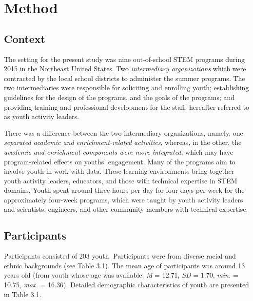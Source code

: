 \documentclass[]{book}
\theoremstyle{definition}
\theoremstyle{definition}
\theoremstyle{definition}
\theoremstyle{remark}
\begin{document}
\chapter{Method}\label{method}

\section{Context}\label{context}

The setting for the present study was nine out-of-school STEM programs
during 2015 in the Northeast United States. Two \emph{intermediary
organizations} which were contracted by the local school districts to
administer the summer programs. The two intermediaries were responsible
for soliciting and enrolling youth; establishing guidelines for the
design of the programs, and the goals of the programs; and providing
training and professional development for the staff, hereafter referred
to as youth activity leaders.

There was a difference between the two intermediary organizations,
namely, one \emph{separated academic and enrichment-related activities},
whereas, in the other, the \emph{academic and enrichment components were
more integrated}, which may have program-related effects on youths'
engagement. Many of the programs aim to involve youth in work with data.
These learning environments bring together youth activity leaders,
educators, and those with technical expertise in STEM domains. Youth
spent around three hours per day for four days per week for the
approximately four-week programs, which were taught by youth activity
leaders and scientists, engineers, and other community members with
technical expertise.

\section{Participants}\label{participants}

Participants consisted of 203 youth. Participants were from diverse
racial and ethnic backgrounds (see Table 3.1). The mean age of
participants was around 13 years old (from youth whose age was
available: \emph{M} = 12.71, \emph{SD} = 1.70, \emph{min.} = 10.75,
\emph{max.} = 16.36). Detailed demographic characteristics of youth are
presented in Table 3.1.
\end{document}
